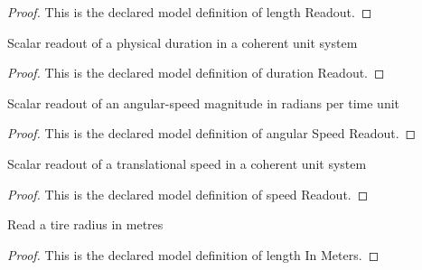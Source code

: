 \begin{proof}
  This is the declared model definition of length Readout.
\end{proof}
\begin{definition}
  \label{def:physics:phyx-mini-0225:phyxminiproblems-problemphyxmini0225-durationreadout}
  Scalar readout of a physical duration in a coherent unit system
\end{definition}
\begin{proof}
  This is the declared model definition of duration Readout.
\end{proof}
\begin{definition}
  \label{def:physics:phyx-mini-0225:phyxminiproblems-problemphyxmini0225-angularspeedreadout}
  Scalar readout of an angular-speed magnitude in radians per time unit
\end{definition}
\begin{proof}
  This is the declared model definition of angular Speed Readout.
\end{proof}
\begin{definition}
  \label{def:physics:phyx-mini-0225:phyxminiproblems-problemphyxmini0225-speedreadout}
  Scalar readout of a translational speed in a coherent unit system
\end{definition}
\begin{proof}
  This is the declared model definition of speed Readout.
\end{proof}
\begin{definition}
  \label{def:physics:phyx-mini-0225:phyxminiproblems-problemphyxmini0225-lengthinmeters}
  Read a tire radius in metres
\end{definition}
\begin{proof}
  This is the declared model definition of length In Meters.
\end{proof}
